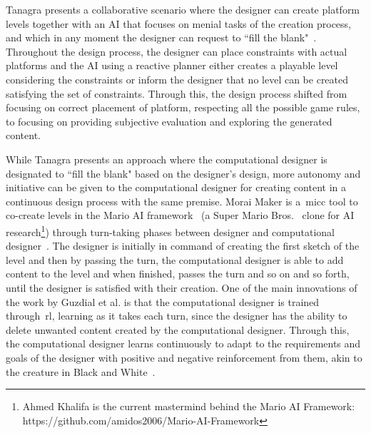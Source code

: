 

Tanagra presents a collaborative scenario where the designer can create platform levels together with an AI that focuses on menial tasks of the creation process, and which in any moment the designer can request to ``fill the blank"~\cite{smith_tanagra:_2011}. Throughout the design process, the designer can place constraints with actual platforms and the AI using a reactive planner either creates a playable level considering the constraints or inform the designer that no level can be created satisfying the set of constraints. Through this, the design process shifted from focusing on correct placement of platform, respecting all the possible game rules, to focusing on providing subjective evaluation and exploring the generated content.


While Tanagra presents an approach where the computational designer is designated to ``fill the blank" based on the designer's design, more autonomy and initiative can be given to the computational designer for creating content in a continuous design process with the same premise. Morai Maker is a~\acrshort{micc} tool to co-create levels in the Mario AI framework~\cite{Karakovskiy2012-MarioAI} (a Super Mario Bros.~\cite{mario} clone for AI research\footnote{Ahmed Khalifa is the current mastermind behind the Mario AI Framework: https://github.com/amidos2006/Mario-AI-Framework}) through turn-taking phases between designer and computational designer~\cite{guzdial-lvldsg-aiide-2018}. The designer is initially in command of creating the first sketch of the level and then by passing the turn, the computational designer is able to add content to the level and when finished, passes the turn and so on and so forth, until the designer is satisfied with their creation. One of the main innovations of the work by Guzdial et al. is that the computational designer is trained through~\acrshort{rl}, learning as it takes each turn, since the designer has the ability to delete unwanted content created by the computational designer. Through this, the computational designer learns continuously to adapt to the requirements and goals of the designer with positive and negative reinforcement from them, akin to the creature in Black and White~\cite{BW2}.

